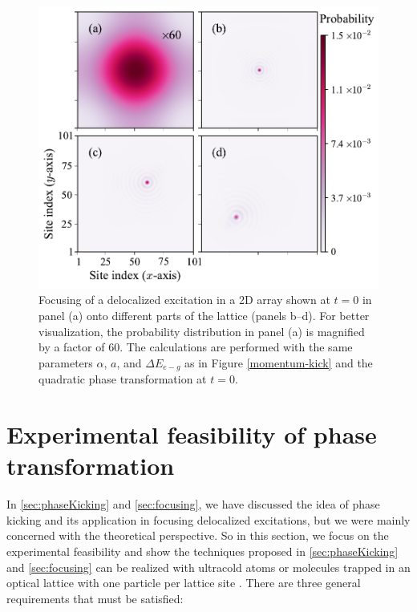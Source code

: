 \begin{figure}[htbp]
\centering
\includegraphics[width=\linewidth]{focusing-2d.pdf}
\caption{Focusing of a delocalized excitation in a 2D array shown
at $t=0$ in panel (a) onto different parts of the lattice (panels
b--d). For better visualization, the probability  distribution in panel (a) is magnified by a factor of 60. The calculations are performed with
the same parameters $\alpha$, $a$, and $\Delta E_{e-g}$ as in
Figure \ref{momentum-kick} and the quadratic phase transformation
at $t=0$.
 }\label{focusing-2d}
\end{figure}


\section{ Experimental feasibility of phase transformation}
\label{sec:excitationAtomMolecule}

In  \autoref{sec:phaseKicking}  and \autoref{sec:focusing}, we have discussed the idea of phase kicking and its
 application in focusing delocalized excitations, but we were mainly concerned with the theoretical perspective. So in 
this section, we focus on the experimental feasibility and show
the techniques proposed in \autoref{sec:phaseKicking}  and \autoref{sec:focusing}  can be realized with ultracold atoms or molecules trapped in an
optical lattice  with one particle per lattice site \cite{atom-mott1, atom-mott2, atom-mott3, Ye-arrays-PRL12}.
There are three general requirements that must be satisfied:

